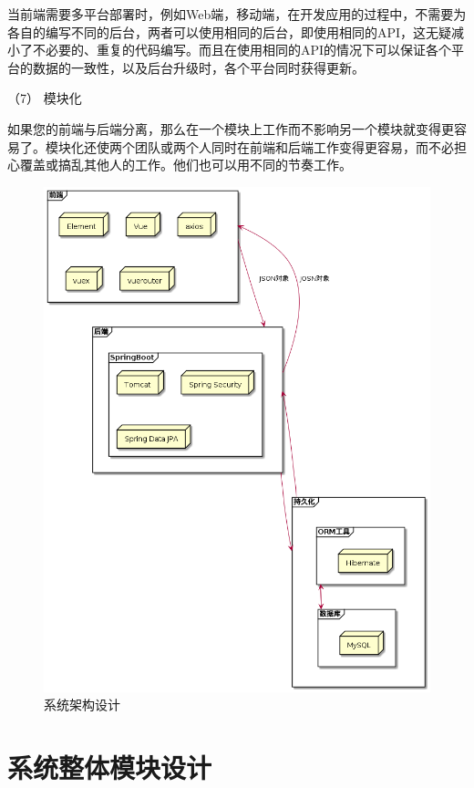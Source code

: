 当前端需要多平台部署时，例如Web端，移动端，在开发应用的过程中，不需要为各自的编写不同的后台，两者可以使用相同的后台，即使用相同的API，这无疑减小了不必要的、重复的代码编写。而且在使用相同的API的情况下可以保证各个平台的数据的一致性，以及后台升级时，各个平台同时获得更新。

（7） 模块化

如果您的前端与后端分离，那么在一个模块上工作而不影响另一个模块就变得更容易了。模块化还使两个团队或两个人同时在前端和后端工作变得更容易，而不必担心覆盖或搞乱其他人的工作。他们也可以用不同的节奏工作。

\begin{figure}[htbp]
    \centering
    \includegraphics[scale = 0.46]{out/uml/部署图/系统架构/系统架构.png}
    \caption{\song\wuhao 系统架构设计}
    \label{system-frame-deployment}
\end{figure}

\section{系统整体模块设计}

